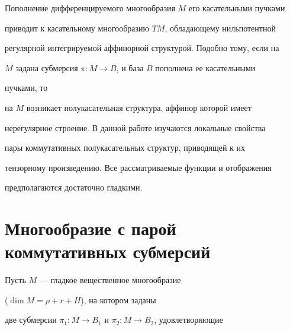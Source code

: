 \date{}







\pagestyle{plain} %













\maketitle


\label{begin}





Пополнение дифференцируемого многообразия $M$ его касательными пучками


приводит к касательному многообразию $TM$, обладающему нильпотентной


регулярной интегрируемой аффинорной структурой. Подобно тому, если на


$M$ задана субмерсия $\pi:M\to B$, и база $B$ пополнена ее касательными


пучками, то


на $M$ возникает полукасательная структура, аффинор которой имеет


нерегулярное строение. В данной работе изучаются локальные свойства


пары коммутативных полукасательных структур, приводящей к их


тензорному произведению. Все рассматриваемые функции и отображения


предполагаются достаточно гладкими.





\section{Многообразие с парой коммутативных субмерсий}





Пусть $M$ --- гладкое вещественное многообразие


($\dim M=\rho+r+H$), на котором заданы


две субмерсии $\pi_1:M\to B_1$ и $\pi_2:M\to B_2$, удовлетворяющие


